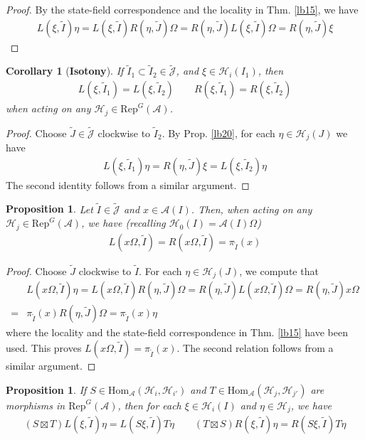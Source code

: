 \documentclass[11pt,b5paper,notitlepage]{article}
\theoremstyle{definition}
\theoremstyle{plain}
\newtheorem{pp}[df]{Proposition}
\newtheorem{co}[df]{Corollary}
\newcommand{\wtd}{\widetilde}
\newcommand{\Hom}{\mathrm{Hom}}
\newcommand{\RepGA}{\mathrm{Rep}^G(\mathcal A)}
\newcommand{\Jtd}{\widetilde{\mathcal J}}
\newcommand{\MA}{\mathcal A}
\newcommand{\MH}{\mathcal H}
\numberwithin{equation}{section}
\begin{document}
\begin{proof}
By the state-field correspondence and the locality in Thm. \ref{lb15}, we have
\begin{align*}
L(\xi,\wtd I)\eta=L(\xi,\wtd I)R(\eta,\wtd J)\Omega=R(\eta,\wtd J)L(\xi,\wtd I)\Omega=R(\eta,\wtd J)\xi
\end{align*}
\end{proof}

\begin{co}[\textbf{Isotony}]\label{lb31}
If $\wtd I_1\subset\wtd I_2\in\Jtd$, and $\xi\in\MH_i(I_1)$, then 
\begin{align*}
L(\xi,\wtd I_1)=L(\xi,\wtd I_2)\qquad R(\xi,\wtd I_1)=R(\xi,\wtd I_2)
\end{align*}
when acting on any  $\MH_j\in\RepGA$.
\end{co}

\begin{proof}
Choose $\wtd J\in\Jtd$ clockwise to $\wtd I_2$. By Prop. \ref{lb20}, for each $\eta\in\MH_j(J)$ we have
\begin{align*}
L(\xi,\wtd I_1)\eta=R(\eta,\wtd J)\xi=L(\xi,\wtd I_2)\eta
\end{align*}
The second identity follows from a similar argument.
\end{proof}


\begin{pp}\label{lb22}
Let $\wtd I\in\Jtd$ and $x\in\MA(I)$. Then, when acting on any $\MH_j\in\RepGA$, we have (recalling $\MH_0(I)=\MA(I)\Omega$)
\begin{align*}
L(x\Omega,\wtd I)=R(x\Omega,\wtd I)=\pi_{\wtd I}(x)
\end{align*}
\end{pp}

\begin{proof}
Choose $\wtd J$ clockwise to $\wtd I$. For each $\eta\in\MH_j(J)$, we compute that
\begin{align*}
&L(x\Omega,\wtd I)\eta=L(x\Omega,\wtd I)R(\eta,\wtd J)\Omega=R(\eta,\wtd J)L(x\Omega,\wtd I)\Omega=R(\eta,\wtd J)x\Omega\\
=&\pi_{\wtd I}(x)R(\eta,\wtd J)\Omega=\pi_{\wtd I}(x)\eta
\end{align*}
where the locality and the state-field correspondence in Thm. \ref{lb15} have been used. This proves $L(x\Omega,\wtd I)=\pi_{\wtd I}(x)$. The second relation follows from a similar argument.
\end{proof}


\begin{pp}\label{lb26}
If $S\in\Hom_\MA(\MH_i,\MH_{i'})$ and $T\in\Hom_\MA(\MH_j,\MH_{j'})$ are morphisms in $\RepGA$, then for each $\xi\in\MH_i(I)$ and $\eta\in\MH_j$, we have
\begin{align*}
(S\boxtimes T)L(\xi,\wtd I)\eta=L(S\xi,\wtd I)T\eta\qquad (T\boxtimes S)R(\xi,\wtd I)\eta=R(S\xi,\wtd I)T\eta
\end{align*}
\end{pp}
\end{document}
